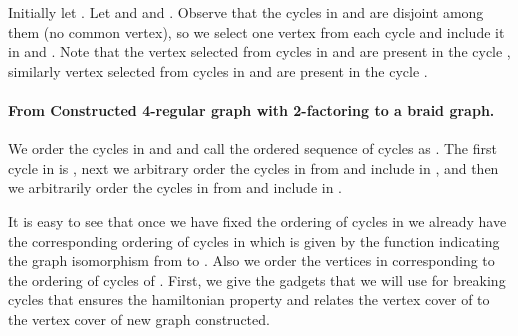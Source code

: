 \documentclass[svgnames]{llncs}
\newcommand{\braid}{braid}
\begin{document}
{Initially let . Let    and  and . Observe that the cycles in  and  are disjoint among them (no common vertex), so we select one vertex from each cycle  and include it in  and 
.
Note that the vertex selected from cycles in  and  are present in the cycle ,
similarly vertex selected from cycles in  and  are present in the cycle .

\paragraph{From Constructed 4-regular graph with 2-factoring  to a \braid{} graph.} We order the cycles in  and  and call the ordered sequence of cycles as . The first cycle in  is , 
next we arbitrary order the cycles in 
from  and include in ,
and then we arbitrarily order the cycles in  from  and include in .

It is easy to see that once we have fixed the ordering of cycles in  we already have the corresponding ordering of cycles in  which is given by the function  indicating the graph isomorphism 
from  to . Also we order the vertices in  corresponding to the ordering of cycles of . First, we give the gadgets that we will use for breaking cycles that ensures 
the hamiltonian property and relates the vertex cover of  to the vertex cover of new graph constructed.


}
\end{document}
